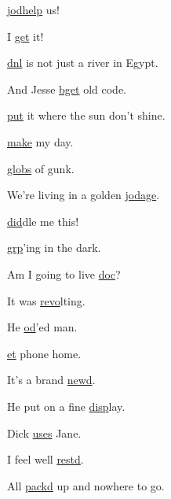 \begin{center}

	\hyperlink{il:jodhelp}{jodhelp} us!
	
	I \hyperlink{il:get}{get} it!

   \hyperlink{il:dnl}{dnl} is not just a river in Egypt.
   
   And Jesse \hyperlink{il:bget}{bget} old code.
	
	\hyperlink{il:put}{put} it where the sun don't shine.
	
	\hyperlink{il:make}{make} my day.

   \hyperlink{il:globs}{globs} of gunk.
	
	We're living in a golden \hyperlink{il:jodage}{jodage}.
	
	\hyperlink{il:did}{did}dle me this!
	
	\hyperlink{il:grp}{grp}'ing in the dark.
	
	Am I going to live \hyperlink{il:doc}{doc}?
	
	It was \hyperlink{il:revo}{revo}lting.
	
	He \hyperlink{il:od}{od}'ed man.
	
	\hyperlink{il:et}{et} phone home.
	
	It's a brand \hyperlink{il:newd}{newd}.
	
	He put on a fine \hyperlink{il:disp}{disp}lay.
	
	Dick \hyperlink{il:uses}{uses} Jane.
	
	I feel well \hyperlink{il:restd}{restd}.
	
	All \hyperlink{il:packd}{packd} up and nowhere to go.
\end{center}

\normalsize	
\normalfont	

%

%

	
